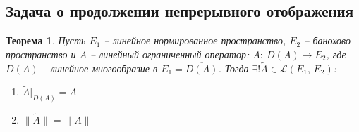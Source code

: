 \documentclass[a4paper,12pt]{article}
\theoremstyle{plain}
\newtheorem{theorem}{Теорема}[section]
\theoremstyle{definition}
\theoremstyle{remark}
\begin{document}
\subsection{Задача о продолжении непрерывного отображения}
\begin{theorem}
  Пусть $E_1$ -- линейное нормированное пространство, $E_2$ -- банохово пространство и $A$ -- линейный ограниченный оператор: $A :\: D(A) \to E_2$, где $D(A)$ -- линейное многообразие в $E_1 = \overline{D(A)}$. Тогда $\exists! \tilde{A} \in \mathcal{L}(E_1,\,E_2)$:
  \begin{enumerate}
    \item $\tilde{A}|_{D(A)} = A$
    \item $\|\tilde{A}\| = \|A\|$
  \end{enumerate}
\end{theorem}
\end{document}
